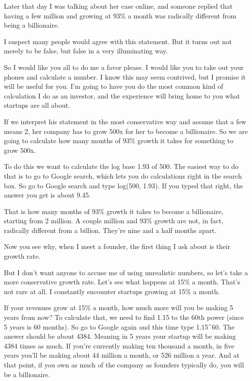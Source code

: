 Later that day I was talking about her case online, and someone replied
that having a few million and growing at 93\% a month was radically
different from being a billionaire.

I suspect many people would agree with this statement. But it turns out
not merely to be false, but false in a very illuminating way.

So I would like you all to do me a favor please. I would like you to
take out your phones and calculate a number. I know this may seem
contrived, but I promise it will be useful for you. I'm going to have
you do the most common kind of calculation I do as an investor, and the
experience will bring home to you what startups are all about.

If we interpret his statement in the most conservative way and assume
that a few means 2, her company has to grow 500x for her to become a
billionaire. So we are going to calculate how many months of 93\% growth
it takes for something to grow 500x.

To do this we want to calculate the log base 1.93 of 500. The easiest
way to do that is to go to Google search, which lets you do calculations
right in the search box. So go to Google search and type log(500, 1.93).
If you typed that right, the answer you get is about 9.45.

That is how many months of 93\% growth it takes to become a billionaire,
starting from 2 million. A couple million and 93\% growth are not, in
fact, radically different from a billion. They're nine and a half months
apart.

Now you see why, when I meet a founder, the first thing I ask about is
their growth rate.

But I don't want anyone to accuse me of using unrealistic numbers, so
let's take a more conservative growth rate. Let's see what happens at
15\% a month. That's not rare at all. I constantly encounter startups
growing at 15\% a month.

If your revenues grow at 15\% a month, how much more will you be making
5 years from now? To calculate that, we need to find 1.15 to the 60th
power (since 5 years is 60 months). So go to Google again and this time
type 1.15\^{}60. The answer should be about 4384. Meaning in 5 years
your startup will be making 4384 times as much. If you're currently
making ten thousand a month, in five years you'll be making about 44
million a month, or 526 million a year. And at that point, if you own as
much of the company as founders typically do, you will be a billionaire.


